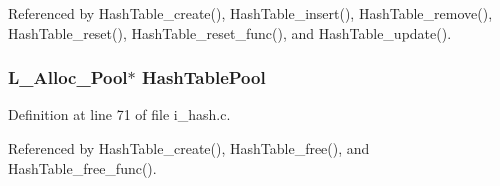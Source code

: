 Referenced by Hash\-Table\_\-create(), Hash\-Table\_\-insert(), Hash\-Table\_\-remove(), Hash\-Table\_\-reset(), Hash\-Table\_\-reset\_\-func(), and Hash\-Table\_\-update().
\subsubsection{\setlength{\rightskip}{0pt plus 5cm}\bf{L\_\-Alloc\_\-Pool}$\ast$ \bf{Hash\-Table\-Pool}}\label{i__hash_8h_51ba8cadbb11bf5bb3e5e7d12a75ede2}




Definition at line 71 of file i\_\-hash.c.

Referenced by Hash\-Table\_\-create(), Hash\-Table\_\-free(), and Hash\-Table\_\-free\_\-func().